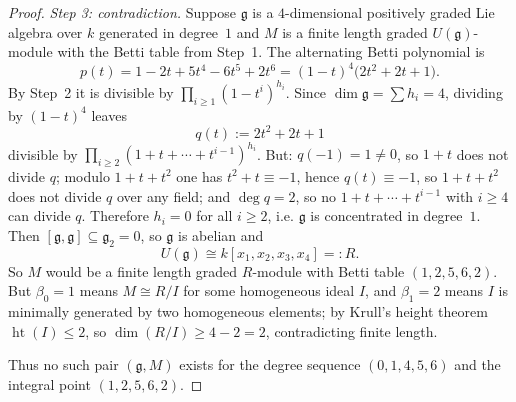 \documentclass[11pt,reqno]{amsart}
\numberwithin{equation}{section}
\theoremstyle{definition}
\begin{document}
\begin{proof}
\smallskip
\noindent\emph{Step 3: contradiction.} Suppose $\mathfrak g$ is a
$4$-dimensional positively graded Lie algebra over $k$ generated in
degree~$1$ and $M$ is a finite length graded $U(\mathfrak g)$-module with
the Betti table from Step~1. The alternating Betti polynomial is
\[
   p(t)=1-2t+5t^4-6t^5+2t^6=(1-t)^4\bigl(2t^2+2t+1\bigr).
\]
By Step~2 it is divisible by $\prod_{i\ge 1}(1-t^i)^{h_i}$. Since
$\dim\mathfrak g=\sum h_i=4$, dividing by $(1-t)^4$ leaves
\[
   q(t):=2t^2+2t+1
\]
divisible by $\prod_{i\ge 2}(1+t+\cdots+t^{i-1})^{h_i}$. But:
$q(-1)=1\ne 0$, so $1+t$ does not divide $q$; modulo $1+t+t^2$ one has
$t^2+t\equiv -1$, hence $q(t)\equiv -1$, so $1+t+t^2$ does not divide
$q$ over any field; and $\deg q=2$, so no $1+t+\cdots+t^{i-1}$ with
$i\ge 4$ can divide $q$. Therefore $h_i=0$ for all $i\ge 2$, i.e.
$\mathfrak g$ is concentrated in degree~$1$. Then
$[\mathfrak g,\mathfrak g]\subseteq\mathfrak g_2=0$, so $\mathfrak g$ is
abelian and
\[
   U(\mathfrak g)\cong k[x_1,x_2,x_3,x_4]=:R.
\]
So $M$ would be a finite length graded $R$-module with Betti table
$(1,2,5,6,2)$. But $\beta_0=1$ means $M\cong R/I$ for some homogeneous
ideal $I$, and $\beta_1=2$ means $I$ is minimally generated by two
homogeneous elements; by Krull's height theorem $\operatorname{ht}(I)\le 2$,
so $\dim(R/I)\ge 4-2=2$, contradicting finite length.

Thus no such pair $(\mathfrak g,M)$ exists for the degree sequence
$(0,1,4,5,6)$ and the integral point $(1,2,5,6,2)$.
\end{proof}
\end{document}
